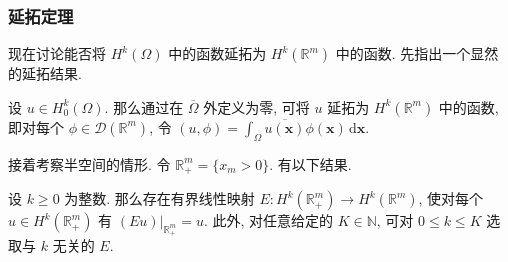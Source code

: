 \subsubsection{延拓定理}\label{subsec:sobolev-extension-theorems}

现在讨论能否将 $H^k(\Omega)$ 中的函数延拓为 $H^k(\mathbb{R}^m)$ 中的函数. 先指出一个显然的延拓结果.

\begin{Lemma}
\label{lem:zero-boundary-sobolev-zero-extension}
设 $u\in H_0^k(\Omega)$. 那么通过在 $\overline\Omega$ 外定义为零, 可将 $u$ 延拓为 $H^k(\mathbb{R}^m)$ 中的函数, 即对每个 $\phi\in\mathcal{D}(\mathbb{R}^m)$, 令 $(u,\phi)=\int_{\Omega}\overline{u(\bm{x})}\phi(\bm{x})\,\mathrm{d}\bm{x}$.
\end{Lemma}

\begingroup
{}
\renewcommand{\endProof}{\par\nobreak\hfill$\blacksquare$\par\vspace{0.1cm}}
\endgroup

接着考察半空间的情形. 令 $\mathbb{R}_+^m=\{x_m>0\}$. 有以下结果.

\begin{Theorem}
\label{thm:halfspace-sobolev-bounded-extension}
设 $k\geq0$ 为整数. 那么存在有界线性映射 $E:H^k(\mathbb{R}_+^m)\to H^k(\mathbb{R}^m)$, 使对每个 $u\in H^k(\mathbb{R}_+^m)$ 有 $(Eu)|_{\mathbb{R}_+^m}=u$. 此外, 对任意给定的 $K\in\mathbb{N}$, 可对 $0\leq k\leq K$ 选取与 $k$ 无关的 $E$.
\end{Theorem}

